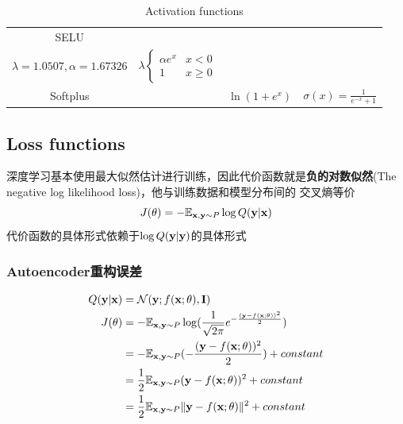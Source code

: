 \begin{table}[h]
\begin{tabular}{c|c|c|c}
            \normalrule
            SELU            &               & \makecell{$\lambda \begin{cases}
                \alpha(e^x - 1) & x < 0\\
                x               & x \geqslant 0
            \end{cases}$ \\
            $\lambda = 1.0507, \alpha = 1.67326$}
             & $\lambda \begin{cases}
                 \alpha e^x & x < 0 \\
                 1          & x \geqslant 0
            \end{cases}$\\
            \normalrule
            Softplus        &               & $\ln(1 + e^x)$ & $\sigma(x) = \frac{1}{e^{-x} + 1}$\\
			\bottomrule
	    \end{tabular}
	\caption{Activation functions}
	\label{tab:activation_functions}
\end{table}

\subsection{Loss functions}
深度学习基本使用最大似然估计进行训练，因此代价函数就是\textbf{负的对数似然}(The negative log likelihood loss)，他与训练数据和模型分布间的
交叉熵等价
\[
    J(\theta) = - \mathbb{E}_{\mathbf{x}, \mathbf{y} \sim P} \log Q(\mathbf{y}|\mathbf{x})
\]
代价函数的具体形式依赖于$\log Q(\mathbf{y}|\mathbf{y})$的具体形式

\subsubsection{Autoencoder重构误差}
\begin{align}
    Q(\mathbf{y}|\mathbf{x})  &= \mathcal{N}(\mathbf{y}; f(\mathbf{x}; \theta), \mathbf{I}) \\
    J(\theta)   &= -\mathbb{E}_{\mathbf{x}, \mathbf{y} \sim P} \log ( \frac{1}{\sqrt{2 \pi}} e ^{-\frac{(\mathbf{y} - f(\mathbf{x}; \theta))^2}{2}}) \\
                &= -\mathbb{E}_{\mathbf{x}, \mathbf{y} \sim P} (-\frac{(\mathbf{y} - f(\mathbf{x}; \theta))^2}{2}) + constant \\
                &= \frac{1}{2} \mathbb{E}_{\mathbf{x}, \mathbf{y} \sim P} (\mathbf{y} - f(\mathbf{x}; \theta))^2 + constant \\
                &= \frac{1}{2} \mathbb{E}_{\mathbf{x}, \mathbf{y} \sim P} \|\mathbf{y} - f(\mathbf{x}; \theta)\|^2 + constant
\end{align}



